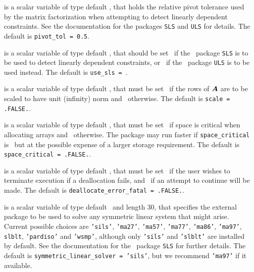 \documentclass{galahad}
\newcommand{\packagename}{FDC}
\newcommand{\fullpackagename}{\libraryname\_\-\packagename}
\begin{document}
\begin{description}
 is a scalar variable of type default
\realdp, that holds the
relative pivot  tolerance used by the matrix factorization when
attempting to detect linearly dependent constraints.
See the documentation for the packages {\tt SLS} and {\tt ULS} for details.
The default is {\tt pivot\_tol = 0.5}.


 is a scalar variable of type default
\logical, that should be set \true\ if the
\libraryname\ package {\tt SLS} is to be used
to detect linearly dependent constraints, or \false\ if
the \libraryname\ package {\tt ULS} is to be used instead.
The default is {\tt use\_sls = }\false.

 is a scalar variable of type default \logical,
that must be set \true\ if the rows of ${\bm{A}}$ are to be scaled to
have unit (infinity) norm and  \false\ otherwise.
The default is {\tt scale = .FALSE.}.

 is a scalar variable of type default \logical,
that must be set \true\ if space is critical when allocating arrays
and  \false\ otherwise. The package may run faster if
{\tt space\_critical} is \false\ but at the possible expense of a larger
storage requirement. The default is {\tt space\_critical = .FALSE.}.

 is a scalar variable of type default \logical,
that must be set \true\ if the user wishes to terminate execution if
a deallocation  fails, and \false\ if an attempt to continue
will be made. The default is {\tt deallocate\_error\_fatal = .FALSE.}.

 is a scalar variable of type default 
\character\ and length 30, that specifies the external package to be used to
solve any symmetric linear system that might arise. Current possible
choices are {\tt 'sils'}, {\tt 'ma27'}, {\tt 'ma57'}, {\tt 'ma77'},
{\tt 'ma86'}, {\tt 'ma97'}, {\tt slblt}, {\tt 'pardiso'}
and {\tt 'wsmp'},
although only {\tt 'sils'} and {\tt 'slblt'} are installed by default.
See the documentation for the \galahad\ package {\tt SLS} for further details.
The default is {\tt symmetric\_linear\_solver = 'sils'},
but we recommend {\tt 'ma97'} if it available.


\end{description}
\end{document}
